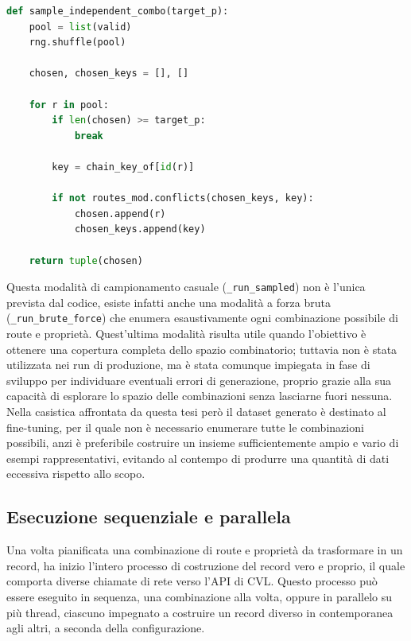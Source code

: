 \documentclass[12pt,a4paper,openright,twoside]{book}
\begin{document}
\begin{lstlisting}[language=Python, caption={Campionamento casuale di un insieme di route indipendenti tra loro per un singolo record.}, label={lst:sample-combo}]
def sample_independent_combo(target_p):
    pool = list(valid)
    rng.shuffle(pool)
    
    chosen, chosen_keys = [], []
    
    for r in pool:
        if len(chosen) >= target_p:
            break
            
        key = chain_key_of[id(r)]
        
        if not routes_mod.conflicts(chosen_keys, key):
            chosen.append(r)
            chosen_keys.append(key)
            
    return tuple(chosen)
\end{lstlisting}

Questa modalità di campionamento casuale (\texttt{\_run\_sampled}) non è l'unica
prevista dal codice, esiste infatti anche una modalità a forza bruta
(\texttt{\_run\_brute\_force}) che enumera esaustivamente ogni combinazione
possibile di route e proprietà. Quest'ultima modalità risulta utile quando
l'obiettivo è ottenere una copertura completa dello spazio combinatorio;
tuttavia non è stata utilizzata nei run di produzione, ma è stata comunque
impiegata in fase di sviluppo per individuare eventuali errori di generazione,
proprio grazie alla sua capacità di esplorare lo spazio delle combinazioni senza
lasciarne fuori nessuna. Nella casistica affrontata da questa tesi però il
dataset generato è destinato al fine-tuning, per il quale non è necessario
enumerare tutte le combinazioni possibili, anzi è preferibile costruire un
insieme sufficientemente ampio e vario di esempi rappresentativi, evitando al
contempo di produrre una quantità di dati eccessiva rispetto allo scopo.

\subsection{Esecuzione sequenziale e parallela}
\label{sec:impl-execution}

Una volta pianificata una combinazione di route e proprietà da trasformare in un
record, ha inizio l'intero processo di costruzione del record vero e proprio, il
quale comporta diverse chiamate di rete verso l'API di CVL. Questo processo può
essere eseguito in sequenza, una combinazione alla volta, oppure in parallelo su
più thread, ciascuno impegnato a costruire un record diverso in contemporanea
agli altri, a seconda della configurazione.
\end{document}

